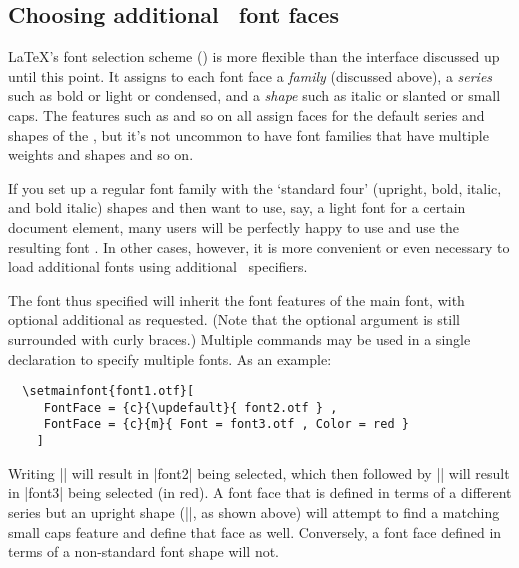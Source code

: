 \subsection{Choosing additional \NFSS\ font faces}

\LaTeX's font selection scheme (\NFSS) is more flexible than the  interface discussed up until this point.
It assigns to each font face a \emph{family} (discussed above), a \emph{series} such as bold or light or condensed, and a \emph{shape} such as italic or slanted or small caps.
The  features such as  and so on all assign faces for the default series and shapes of the \NFSS, but it's not uncommon to have font families that have multiple weights and shapes and so on.

If you set up a regular font family with the `standard four' (upright, bold, italic, and bold italic) shapes and then want to use, say, a light font for a certain document element, many users will be perfectly happy to use  and use the resulting font .
In other cases, however, it is more convenient or even necessary to load additional fonts using additional \NFSS\ specifiers.


The font thus specified will inherit the font features of the main font, with optional additional  as requested.
(Note that the optional  argument is still surrounded with curly braces.)
Multiple  commands may be used in a single declaration to specify multiple fonts.
As an example:
\begin{Verbatim}
  \setmainfont{font1.otf}[
     FontFace = {c}{\updefault}{ font2.otf } ,
     FontFace = {c}{m}{ Font = font3.otf , Color = red }
    ]
\end{Verbatim}
Writing |\selectfont| will result in |font2| being selected, which then followed by |\selectfont| will result in |font3| being selected (in red).
A font face that is defined in terms of a different series but an upright shape (|\updefault|, as shown above) will attempt to find a matching small caps feature and define that face as well.
Conversely, a font face defined in terms of a non-standard font shape will not.

